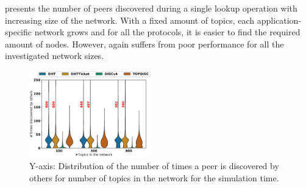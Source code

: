  presents the number of peers discovered during a single lookup operation with increasing size of the network. With a fixed amount of topics, each application-specific network grows and for all the protocols, it is easier to find the required amount of nodes.
 However, \discv again suffers from poor performance for all the investigated network sizes. 

\iffalse %
\begin{figure}
\includegraphics[width=0.470\textwidth]{results/no_split/violin_topic_wasDiscovered.eps}
\caption{Y-axis: Distribution of the number of times a peer is discovered by others for number of topics in the network for the simulation time.}
\label{fig:discoveredByPerTopic}
\end{figure}

